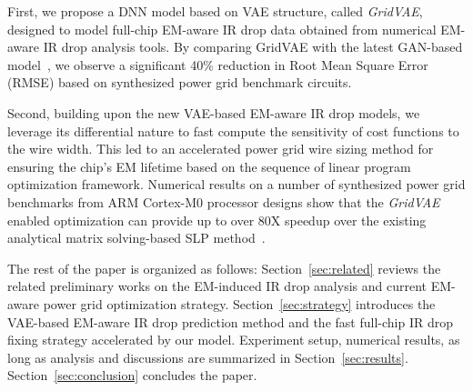 \begin{itemlist}

\item  First, we propose a DNN model based on VAE structure, called {\it GridVAE}, designed to model full-chip EM-aware IR drop data obtained from numerical EM-aware IR drop analysis tools. By comparing GridVAE with the latest GAN-based model~\cite{ZhouJin:ICCAD'20}, we observe a significant 40\% reduction in Root Mean Square Error (RMSE) based on synthesized power grid benchmark circuits.

\item Second, building upon the new VAE-based EM-aware IR drop models, we leverage its differential nature to fast compute the sensitivity of cost functions to the wire width. This led to an accelerated power grid wire sizing method for ensuring the chip's EM lifetime based on the sequence of linear program optimization framework. Numerical results on a number of synthesized power grid benchmarks from ARM Cortex-M0 processor designs show that the {\it GridVAE} enabled optimization can provide up to over $80$X speedup over the existing analytical matrix solving-based SLP method~\cite{Sukharev:2019pg}.
 
\end{itemlist}

The rest of the paper is organized as follows: Section~\ref{sec:related} reviews the related preliminary works on the EM-induced IR drop analysis and current EM-aware power grid optimization strategy. Section~\ref{sec:strategy} introduces the VAE-based EM-aware IR drop prediction method and the fast full-chip IR drop fixing strategy accelerated by our model. Experiment setup, numerical results, as long as analysis and discussions are summarized in Section~\ref{sec:results}.  Section~\ref{sec:conclusion} concludes the paper.